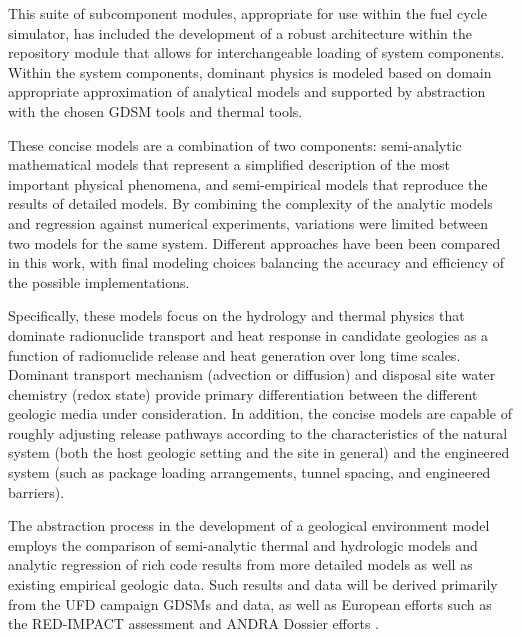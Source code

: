 
This suite of subcomponent modules, appropriate for use within the \Cyclus fuel 
cycle simulator, has included the development of a robust architecture 
within the repository module that allows for interchangeable loading of 
system components.  Within the system components, dominant physics is 
modeled based on domain appropriate approximation of analytical models and 
supported by abstraction with the chosen \gls{GDSM} tools and thermal tools. 


These concise models are a combination of two components: 
semi-analytic mathematical models that represent a simplified description of 
the most important physical phenomena, and semi-empirical models that reproduce 
the results of detailed models.  By combining the complexity of the analytic 
models and regression against numerical experiments, variations were limited 
between two models for the same system.  Different approaches have been been 
compared in this work, with final modeling choices balancing the accuracy and 
efficiency of the possible implementations.  


Specifically, these models focus on the hydrology and thermal 
physics that dominate radionuclide transport and heat response in candidate 
geologies as a function of radionuclide release and heat generation over long 
time scales. Dominant transport mechanism (advection or 
diffusion) and disposal site water chemistry (redox state) provide primary 
differentiation between the different geologic media under consideration. In 
addition, the concise models are capable of roughly adjusting release 
pathways according to the characteristics of the natural system (both the host 
geologic setting and the site in general) and the engineered system (such as package 
loading arrangements, tunnel spacing, and engineered barriers).


The abstraction process in the development of a geological environment model 
employs the comparison of semi-analytic thermal and hydrologic models and 
analytic regression of rich code results from more detailed models as well as 
existing empirical geologic data. Such results and data will be derived 
primarily from the \gls{UFD} campaign \glspl{GDSM} and data, as well as European 
efforts such as the RED-IMPACT assessment and \gls{ANDRA} Dossier efforts 
\cite{von_lensa_red-impact_2008, andra_argile:_2005, clayton_generic_2011} . 

